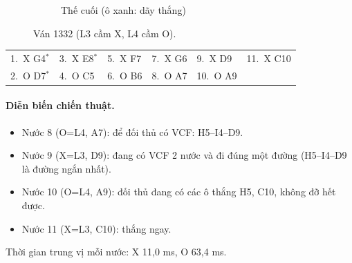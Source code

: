 \begin{figure}[H]
\begin{subfigure}[t]{.48\linewidth}
    \caption{Thế cuối (ô xanh: dãy thắng)}
  \end{subfigure}
  \caption{Ván 1332 (L3 cầm X, L4 cầm O).}
  \label{fig:cs-van-14}
\end{figure}
{\footnotesize\linespread{1}\selectfont
\noindent\begin{tabularx}{\linewidth}{*{6}{X}}
\toprule
1.~X G4$^\ast$ & 3.~X E8$^\ast$ & 5.~X F7 & 7.~X G6 & 9.~X D9 & 11.~X C10 \\
2.~O D7$^\ast$ & 4.~O C5 & 6.~O B6 & 8.~O A7 & 10.~O A9 &  \\
\bottomrule
\end{tabularx}\par}
\paragraph{Diễn biến chiến thuật.}
\begin{itemize}\footnotesize\linespread{1.1}\selectfont
\setlength{\itemsep}{0pt}
  \item Nước 8 (O=L4, A7): để đối thủ có VCF: H5--I4--D9.
  \item Nước 9 (X=L3, D9): đang có VCF 2 nước và đi đúng một đường (H5--I4--D9 là đường ngắn nhất).
  \item Nước 10 (O=L4, A9): đối thủ đang có các ô thắng H5, C10, không đỡ hết được.
  \item Nước 11 (X=L3, C10): thắng ngay.
\end{itemize}
Thời gian trung vị mỗi nước: X 11,0 ms, O 63,4 ms.
\clearpage

